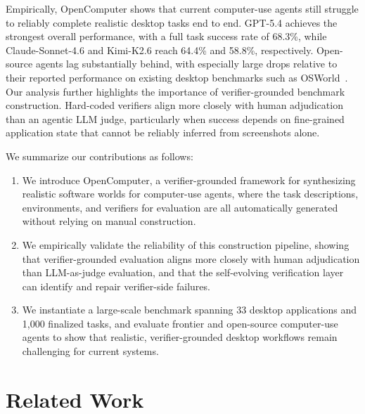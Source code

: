 \documentclass{llmxive}
\providecommand{\nexample}{1,000\xspace}
\providecommand{\napp}{33\xspace}
\providecommand{\ours}{OpenComputer\xspace}
\begin{document}
Empirically, \ours shows that current computer-use agents still struggle to reliably complete realistic desktop tasks end to end. GPT-5.4 achieves the strongest overall performance, with a full task success rate of 68.3\%, while Claude-Sonnet-4.6 and Kimi-K2.6 reach 64.4\% and 58.8\%, respectively. Open-source agents lag substantially behind, with especially large drops relative to their reported performance on existing desktop benchmarks such as OSWorld~\cite{xie2024osworld}. Our analysis further highlights the importance of verifier-grounded benchmark construction. Hard-coded verifiers align more closely with human adjudication than an agentic LLM judge, particularly when success depends on fine-grained application state that cannot be reliably inferred from screenshots alone.

We summarize our contributions as follows:
\begin{enumerate}[leftmargin=*, itemsep=2pt]
    \item We introduce \ours, a verifier-grounded framework for synthesizing realistic software worlds for computer-use agents, where the task descriptions, environments, and verifiers for evaluation are all automatically generated without relying on manual construction.
    
    \item We empirically validate the reliability of this construction pipeline, showing that verifier-grounded evaluation aligns more closely with human adjudication than LLM-as-judge evaluation, and that the self-evolving verification layer can identify and repair verifier-side failures.

    \item We instantiate a large-scale benchmark spanning \napp desktop applications and \nexample finalized tasks, and evaluate frontier and open-source computer-use agents to show that realistic, verifier-grounded desktop workflows remain challenging for current systems.
\end{enumerate}

\section{Related Work}
\label{sec:related-work}
\end{document}
